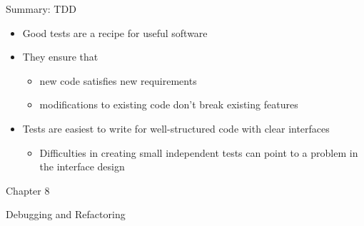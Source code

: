 \documentclass[
ps,
]{prosper}
\begin{document}
\begin{slide}{Summary: TDD}

\begin{itemize}
  
\item Good tests are a recipe for useful software

\item They ensure that

  \begin{itemize}
  \item new code satisfies new requirements
  \item modifications to existing code don't break existing features
  \end{itemize}

\item Tests are easiest to write for well-structured code with clear interfaces
  
  \begin{itemize}

  \item Difficulties in creating small independent tests can point to a
    problem in the interface design

  \end{itemize}

\end{itemize}
  
\end{slide}





\begin{slide}{Chapter 8}

\vspace*{2cm}

\begin{center}
\begin{Huge}
Debugging and Refactoring
\end{Huge}
\end{center}

\end{slide}
\end{document}
